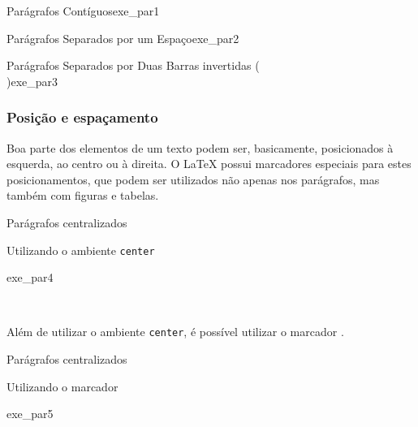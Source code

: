 \begin{texexptitled}[breakable,enhanced,middle=2mm]{Parágrafos Contíguos}{exe_par1}
\lipsumsentence[1-4] 
\lipsumsentence[5-8]
\end{texexptitled}

\begin{texexptitled}[breakable,enhanced,middle=2mm]{Parágrafos Separados por um Espaço}{exe_par2}
\lipsumsentence[1-4]  

\lipsumsentence[5-8]
\end{texexptitled}

\begin{texexptitled}[breakable,enhanced,middle=2mm]{Parágrafos Separados por Duas Barras invertidas (\texttt{\\})}{exe_par3}
\lipsumsentence[1-4] \\ 
\lipsumsentence[5-8]
\end{texexptitled}

\subsubsection*{Posição e espaçamento}
\label{sec:pos_espac}

Boa parte dos elementos de um texto podem ser, basicamente, posicionados à esquerda, ao centro ou à direita. O LaTeX possui marcadores especiais para estes posicionamentos, que podem ser utilizados não apenas nos parágrafos, mas também com figuras e tabelas.

\begin{texexptitled}[breakable,enhanced,middle=2mm]{Parágrafos centralizados \par Utilizando o ambiente \texttt{center}}{exe_par4}
\begin{center}
\lipsumsentence[9-10] \\ 
\lipsumsentence[11-12]
\end{center}
\end{texexptitled}

Além de utilizar o ambiente \texttt{center}, é possível utilizar o marcador \texttt{\centering}.

\begin{texexptitled}[breakable,enhanced,middle=2mm]{Parágrafos centralizados \par Utilizando o marcador \texttt{\centering}}{exe_par5}
\centering
\lipsumsentence[13-14] \\ 
\lipsumsentence[15-16]
\end{texexptitled}


